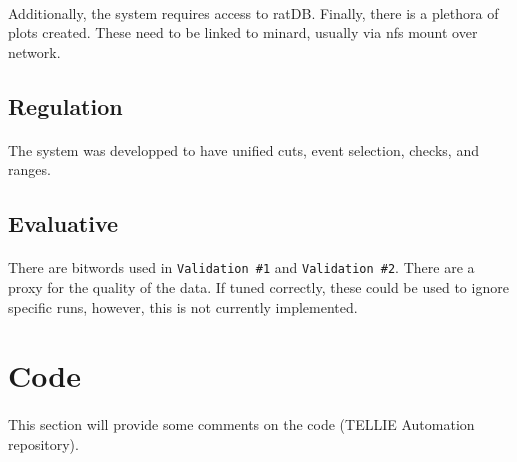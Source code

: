 \documentclass[12pt]{article}
\begin{document}
\paragraph{}
Additionally, the system requires access to ratDB. Finally, there is a plethora of plots created. These need to be linked to minard, usually via nfs mount over network.

\subsection{Regulation}
\paragraph{}
The system was developped to have unified cuts, event selection, checks, and ranges.

\subsection{Evaluative}
\paragraph{}
There are bitwords used in \texttt{Validation \#1} and \texttt{Validation \#2}. There are a proxy for the quality of the data. If tuned correctly, these could be used to ignore specific runs, however, this is not currently implemented.

\clearpage

\section{Code}
\paragraph{}
This section will provide some comments on the code (TELLIE Automation repository).
\end{document}
